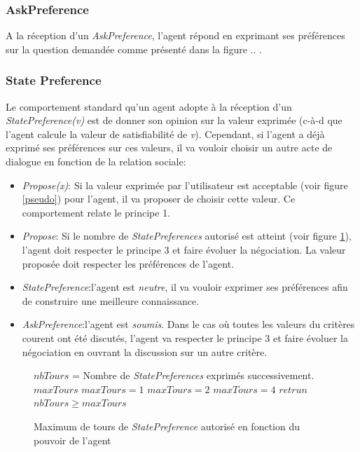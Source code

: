		\subsubsection{AskPreference}
			A la réception d'un \emph{AskPreference}, l'agent répond en exprimant ses préférences sur la question demandée comme présenté dans la figure .. .
	
		\subsubsection{State Preference}
			Le comportement standard qu'un agent adopte à la réception d'un \emph{StatePreference(v)} est de donner son opinion sur la valeur exprimée (c-à-d que l'agent calcule la valeur de satisfiabilité de \textit{v}). Cependant, si l'agent a déjà exprimé ses préférences sur ces valeurs, il va vouloir choisir un autre acte de dialogue en fonction de la relation sociale:
			\begin{itemize}
				\item \emph{Propose(x)}: Si la valeur exprimée par l'utilisateur est acceptable (voir figure \ref{pseudo}) pour l'agent, il va proposer de choisir cette valeur. Ce comportement relate le principe 1.
				\item \emph{Propose}: Si le nombre de \emph{StatePreferences} autorisé est atteint (voir figure \ref{alg:maxtours}), l'agent doit respecter le principe 3 et faire évoluer la négociation. La valeur proposée doit respecter les préférences de l'agent. 
				\item \emph{StatePreference}:l'agent est \emph{neutre}, il va vouloir exprimer ses préférences afin de construire une meilleure connaissance.
				\item \emph{AskPreference}:l'agent est \emph{soumis}. Dans le cas où toutes les valeurs du critères courent ont été discutés, l'agent va respecter le principe 3 et faire évoluer la négociation en ouvrant la discussion sur un autre critère.
			\end{itemize}
			
			\begin{figure}[]
				\begin{algorithmic}[1]\small
					\State $nbTours$ = Nombre de \emph{StatePreferences} exprimés successivement.
					\State $maxTours$ 
					\State $maxTours = 1$
					\EndIf
					 \State $maxTours = 2$
					\EndIf
					\State $maxTours = 4$
					\EndIf
					\State $retrun$ $nbTours\geq maxTours$
					\EndFunction
				\end{algorithmic}
				\vskip 8pt
				\label{alg:maxtours}
				\caption{Maximum de tours de \emph{StatePreference} autorisé en fonction du pouvoir de l'agent}
			\end{figure} 
